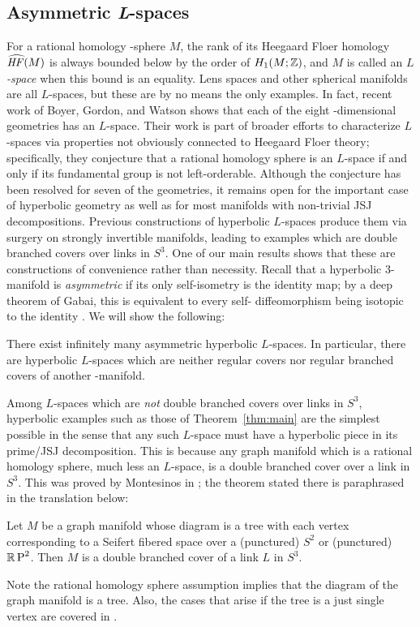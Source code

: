 \subsection{Asymmetric \emph{L}-spaces}
For a rational homology \3-sphere $M$, the rank of its Heegaard Floer
homology $\HFhat(M)$ is always bounded below by the order of
$H_1(M; {\mathbb Z})$, and $M$ is called an \textit{$L$-space} when this bound is an
equality.  Lens spaces and other spherical manifolds are all
$L$-spaces, but these are by no means the only examples.  In fact, recent
work of Boyer, Gordon, and Watson \cite{BoyerGordonWatson2013} shows
that each of the eight \3-dimensional geometries has an
$L$-space. Their work is part of broader efforts to characterize
$L$-spaces via properties not obviously connected to Heegaard
Floer theory; specifically, they conjecture that a rational homology
sphere is an $L$-space if and only if its fundamental group is not
left-orderable. Although the conjecture has been resolved for seven of
the geometries, it remains open for the important case of hyperbolic
geometry as well as for most manifolds with non-trivial JSJ
decompositions.  Previous constructions of hyperbolic $L$-spaces
produce them via surgery on strongly invertible manifolds, leading to
examples which are double branched covers over links in $S^3$.  One of
our main results  shows that these are constructions of convenience
rather than necessity.  Recall that a hyperbolic 3-manifold is
\emph{asymmetric} if its only self-isometry is the identity map; by a
deep theorem of Gabai, this is equivalent to every self\hyp
diffeomorphism being isotopic to the identity \cite{Gabai2001}.  We
will show the following:
 \begin{theorem}\label{thm:main} 
   There exist infinitely many asymmetric hyperbolic $L$-spaces.  In
   particular, there are hyperbolic $L$-spaces which are neither
   regular covers nor regular branched covers of another \3-manifold.
\end{theorem}
\noindent 
Among $L$-spaces which are \emph{not} double branched covers over
links in $S^3$, hyperbolic examples such as those of
Theorem~\ref{thm:main} are the simplest possible in the sense that any
such $L$-space must have a hyperbolic piece in its prime/JSJ
decomposition.  This is because any graph manifold which is a rational
homology sphere, much less an $L$-space, is a double branched cover
over a link in $S^3$. %
This was proved by Montesinos in
\cite[$\S$7.2]{montesinos1973variedades}; the theorem stated there is
paraphrased %
in the translation below: 
\begin{theorem}
Let $M$ be a graph manifold whose diagram is a tree with each vertex  corresponding to a Seifert fibered space over
a (punctured) $S^2$ or (punctured) ${{\mathbb{R}}\,\mathrm{P}}^2$. 
Then $M$ is a double branched cover of a link $L$ in $S^3.$ 
\end{theorem}
\noindent
Note the rational homology sphere assumption implies that the diagram
of the graph manifold is a tree. Also, the cases that arise if the tree is a just single vertex are covered in \cite[$\S$2-3]{montesinos1973variedades}.

